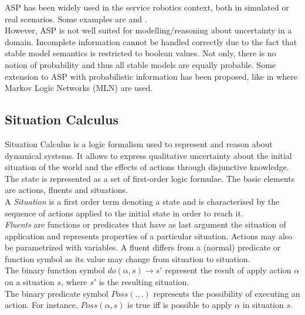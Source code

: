 \documentclass[pdftex,12pt,a4paper]{report}
\begin{document}
\noindent ASP has been widely used in the service robotics context, both in simulated or real scenarios. Some examples are \cite{erdem2012answer} and \cite{chen2010developing}.%
\\\noindent However, ASP is not well suited for modelling/reasoning about uncertainty in a domain. Incomplete information cannot be handled correctly due to the fact that stable model semantics is restricted to boolean values. Not only, there is no notion of probability and thus all stable models are equally probable. Some extension to ASP with probabilistic information has been proposed, like in \cite{wang2015handling}%
where Markov Logic Networks (MLN) are used. %
\newline

\subsection{Situation Calculus}
Situation Calculus\cite{mccarthy1969some}\cite{reiter1993proving} %
is a logic formalism used to represent and reason about dynamical systems. It allows to express qualitative uncertainty about the initial situation of the world and the effects of actions through disjunctive knowledge.
\\\noindent The state is represented as a set of first-order logic formulae. The basic elements are actions, fluents and situations.
\\\noindent A \textit{Situation} is a first order term denoting a state and is characterised by the sequence of actions applied to the initial state in order to reach it. 
\\\noindent \textit{Fluents} are functions or predicates that have as last argument the situation of application and represents properties of a particular situation. Actions may also be parametrized with variables. A fluent differs from a (normal) predicate or function symbol as its value may change from situation to situation.
\\\noindent The binary function symbol $do(\alpha, s) \rightarrow s'$ represent the result of apply action $\alpha$ on a situation $s$, where $s'$ is the resulting situation.
\\\noindent The binary predicate symbol $Poss(.,.)$ represents the possibility of executing an action. For instance, $Poss(\alpha,s)$ is true iff is possible to apply $\alpha$ in situation $s$.
\end{document}
